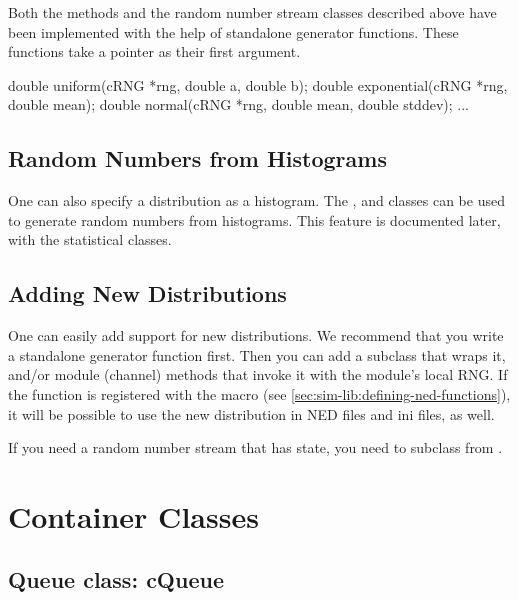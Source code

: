 Both the  methods and the random number stream classes
described above have been implemented with the help of standalone generator
functions. These functions take a  pointer as their first
argument.

\begin{cpp}
double uniform(cRNG *rng, double a, double b);
double exponential(cRNG *rng, double mean);
double normal(cRNG *rng, double mean, double stddev);
...
\end{cpp}

\subsection{Random Numbers from Histograms}
\label{sec:sim-lib:random-numbers-from-histograms}

One can also specify a distribution as a histogram.
The ,  and  classes
can be used to generate random numbers from histograms. This feature is
documented later, with the statistical classes.

\subsection{Adding New Distributions}
\label{sec:sim-lib:adding-new-distributions}

One can easily add support for new distributions. We recommend that
you write a standalone generator function first. Then you can add
a  subclass that wraps it, and/or module (channel)
methods that invoke it with the module's local RNG.
If the function is registered with the 
macro (see \ref{sec:sim-lib:defining-ned-functions}), it will be
possible to use the new distribution in NED files and ini files, as well.

If you need a random number stream that has state, you need to
subclass from .


\section{Container Classes}
\label{sec:sim-lib:container-classes}

\subsection{Queue class: cQueue}
\label{sec:sim-lib:cqueue}

